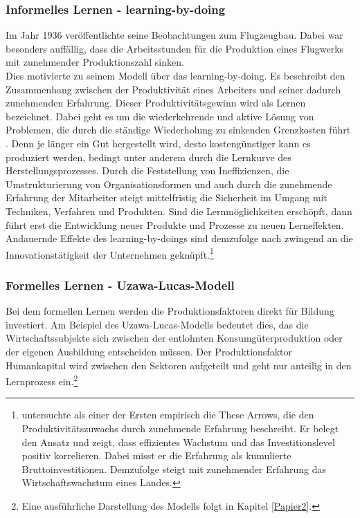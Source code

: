 \subsubsection*{Informelles Lernen - learning-by-doing}
%
Im Jahr 1936 veröffentlichte \cite{Wright.1936} seine Beobachtungen zum Flugzeugbau. Dabei war besonders auffällig, dass die Arbeitsstunden für die Produktion eines Flugwerks mit zunehmender Produktionszahl sinken.\\
%
Dies motivierte \cite{Arrow.1962} zu seinem Modell über das learning-by-doing. Es beschreibt den Zusammenhang zwischen der Produktivität eines Arbeiters und seiner dadurch zunehmenden Erfahrung. Dieser Produktivitätsgewinn wird als Lernen bezeichnet. Dabei geht es um die wiederkehrende und aktive Lösung von Problemen, die durch die ständige Wiederholung zu sinkenden Grenzkosten führt \cite[S.155]{Sheshinski.1967,Arrow.1962}. Denn je länger ein Gut hergestellt wird, desto kostengünstiger kann es produziert werden, bedingt unter anderem durch die Lernkurve des Herstellungsprozesses. Durch die Feststellung von Ineffizienzen, die Umstrukturierung von Organisationsformen und auch durch die zunehmende Erfahrung der Mitarbeiter steigt mittelfristig die Sicherheit im Umgang mit Techniken, Verfahren und Produkten. Sind die Lernmöglichkeiten erschöpft, dann führt erst die Entwicklung neuer Produkte und Prozesse zu neuen Lerneffekten. Andauernde Effekte des learning-by-doings sind demzufolge nach \cite{Arrow.1962} zwingend an die Innovationstätigkeit der Unternehmen geknüpft.\footnote{\cite{Sheshinski.1967} untersuchte als einer der Ersten empirisch die These Arrows, die den Produktivitätszuwachs durch zunehmende Erfahrung beschreibt. Er belegt den Ansatz und zeigt, dass effizientes Wachstum und das Investitionslevel positiv korrelieren. Dabei misst er die Erfahrung als kumulierte Bruttoinvestitionen. Demzufolge steigt mit zunehmender Erfahrung das Wirtschaftswachstum eines Landes.}
%
\subsubsection*{Formelles Lernen - Uzawa-Lucas-Modell}
%
Bei dem formellen Lernen werden die Produktionsfaktoren direkt für Bildung investiert. Am Beispiel des Uzawa-Lucas-Modells bedeutet dies, das die Wirtschaftssubjekte sich zwischen der entlohnten Konsumgüterproduktion oder der eigenen Ausbildung entscheiden müssen. Der Produktionsfaktor Humankapital wird zwischen den Sektoren aufgeteilt und geht nur anteilig in den Lernprozess ein.\footnote{Eine ausführliche Darstellung des Modells folgt in Kapitel \ref{Papier2}.}  
%
